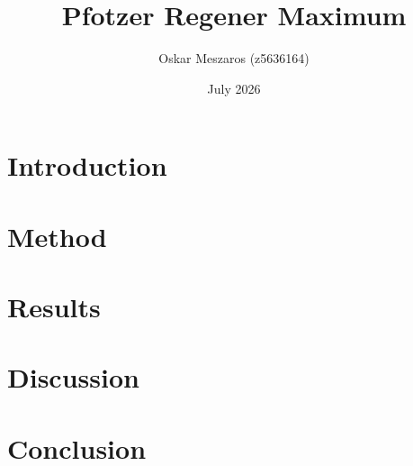 \documentclass{article}
\title{Pfotzer Regener Maximum}
\author{Oskar Meszaros (z5636164)}
\date{July 2026}
\begin{document}
\maketitle

\section{Introduction}

\section{Method}

\section{Results}

\section{Discussion}

\section{Conclusion}
\end{document}

